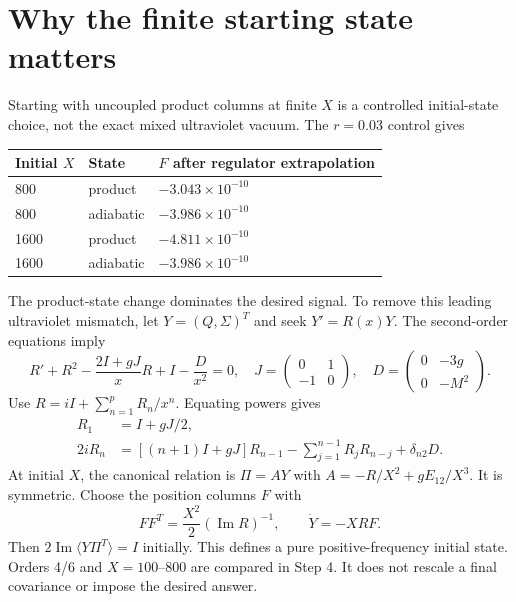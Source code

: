 \documentclass[11pt,a4paper]{article}
\begin{document}
\section{Why the finite starting state matters}
Starting with uncoupled product columns at finite $X$ is a controlled initial-state choice, not the exact mixed ultraviolet vacuum. The $r=0.03$ control gives
\begin{center}\small\begin{tabular}{lll}\toprule Initial $X$ & State & $F$ after regulator extrapolation\\\midrule
800 & product & $-3.043\times10^{-10}$\\
800 & adiabatic & $-3.986\times10^{-10}$\\
1600 & product & $-4.811\times10^{-10}$\\
1600 & adiabatic & $-3.986\times10^{-10}$\\\bottomrule\end{tabular}\end{center}
The product-state change dominates the desired signal. To remove this leading ultraviolet mismatch, let $Y=(Q,\Sigma)^T$ and seek $Y'=R(x)Y$. The second-order equations imply
\begin{equation}R'+R^2-\frac{2I+gJ}{x}R+I-\frac{D}{x^2}=0,\quad J=\begin{pmatrix}0&1\\-1&0\end{pmatrix},\quad D=\begin{pmatrix}0&-3g\\0&-M^2\end{pmatrix}.\end{equation}
Use $R=iI+\sum_{n=1}^{p}R_n/x^n$. Equating powers gives
\begin{align}R_1&=I+gJ/2,\\2iR_n&=[(n+1)I+gJ]R_{n-1}-\sum_{j=1}^{n-1}R_jR_{n-j}+\delta_{n2}D.\end{align}
At initial $X$, the canonical relation is $\Pi=A Y$ with $A=-R/X^2+gE_{12}/X^3$. It is symmetric. Choose the position columns $F$ with
\begin{equation}FF^T=\frac{X^2}{2}(\operatorname{Im}R)^{-1},\qquad\dot Y=-XR F.\end{equation}
Then $2\operatorname{Im}\langle Y\Pi^T\rangle=I$ initially. This defines a pure positive-frequency initial state. Orders 4/6 and $X=100$--$800$ are compared in Step 4. It does not rescale a final covariance or impose the desired answer.

\newpage
\end{document}
